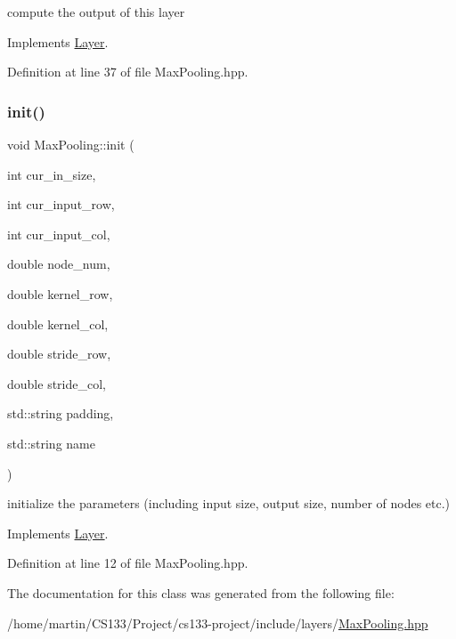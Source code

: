 compute the output of this layer 



Implements \hyperlink{class_layer_ac0b116d692ea457f8e7c0f79f7159004}{Layer}.



Definition at line 37 of file Max\+Pooling.\+hpp.

\mbox{\label{class_max_pooling_ae1834354ff21a90fe14d1a392e923fc4}} 
\subsubsection{\texorpdfstring{init()}{init()}}
{\footnotesize\ttfamily void Max\+Pooling\+::init (\begin{DoxyParamCaption}\item[{int}]{cur\+\_\+in\+\_\+size,  }\item[{int}]{cur\+\_\+input\+\_\+row,  }\item[{int}]{cur\+\_\+input\+\_\+col,  }\item[{double}]{node\+\_\+num,  }\item[{double}]{kernel\+\_\+row,  }\item[{double}]{kernel\+\_\+col,  }\item[{double}]{stride\+\_\+row,  }\item[{double}]{stride\+\_\+col,  }\item[{std\+::string}]{padding,  }\item[{std\+::string}]{name }\end{DoxyParamCaption})\hspace{0.3cm}{\ttfamily [virtual]}}



initialize the parameters (including input size, output size, number of nodes etc.) 



Implements \hyperlink{class_layer_aab662b9c8e61cd7375cbb4413d2e3037}{Layer}.



Definition at line 12 of file Max\+Pooling.\+hpp.



The documentation for this class was generated from the following file\+:\begin{DoxyCompactItemize}
\item 
/home/martin/\+C\+S133/\+Project/cs133-\/project/include/layers/\hyperlink{max_pooling_8hpp}{Max\+Pooling.\+hpp}\end{DoxyCompactItemize}
